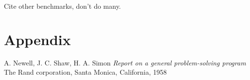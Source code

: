 \documentclass{article}
\begin{document}
Cite other benchmarks, don't do many.

\section{Appendix}

\begin{thebibliography}{9}
        A. Newell, J. C. Shaw, H. A. Simon
        \textit{Report on a general problem-solving program}
        The Rand corporation, Santa Monica, California, 1958
\end{thebibliography}
\end{document}
